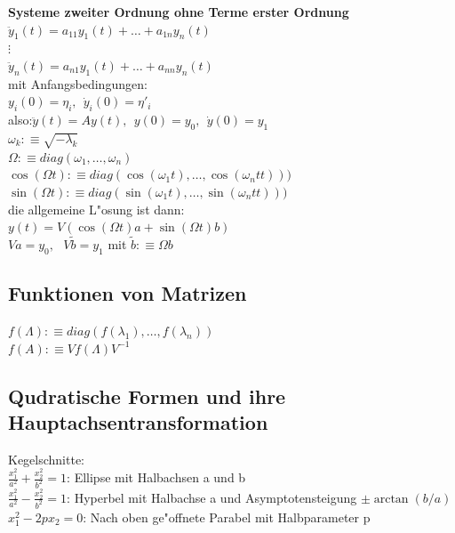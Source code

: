 \documentclass[10pt, a4paper, twocolumn]{scrartcl}
\begin{document}
{\bf Systeme zweiter Ordnung ohne Terme erster Ordnung}\\
$\ddot{y}_1(t)= a_{11}y_1(t) + \ldots + a_{1n}y_n(t)$\\
$\vdots$\\
$\ddot{y}_n(t)= a_{n1}y_1(t) + \ldots + a_{nn}y_n(t)$\\
mit Anfangsbedingungen:\\
$y_i(0)=\eta_i,\:\:\dot{y}_i(0)=\eta'_i$\\
also:$\ddot{y}(t)=Ay(t),\:\:y(0)=y_0,\:\:\dot{y}(0)=y_1$\\
$\omega_k:\equiv \sqrt{-\lambda_k}$\\
$\Omega:\equiv diag(\omega_1,\ldots,\omega_n)$\\
$\cos(\Omega t):\equiv diag(\cos(\omega_1 t),\ldots,\cos(\omega_n t t)))$\\
$\sin(\Omega t):\equiv diag(\sin(\omega_1 t),\ldots,\sin(\omega_n t t)))$\\
die allgemeine L"osung ist dann:\\
$y(t)=V(\cos(\Omega t)a + \sin(\Omega t)b)$\\
$Va=y_0,\:\:\:V\widetilde{b}=y_1$ mit $\widetilde{b}:\equiv\Omega b$


\subsection{Funktionen von Matrizen}

$f(\Lambda) :\equiv diag (f(\lambda_1),\ldots,f(\lambda_n))$\\
$f(A):\equiv Vf(\Lambda)V^{-1}$


\subsection{Qudratische Formen und ihre Hauptachsentransformation}

Kegelschnitte:\\
$\frac{x_1^2}{a^2}+\frac{x_2^2}{b^2}=1$:  Ellipse mit Halbachsen a und b\\
$\frac{x_1^2}{a^2}-\frac{x_2^2}{b^2}=1$:  Hyperbel mit Halbachse a und Asymptotensteigung $\pm\arctan(b/a)$\\
$x_1^2-2px_2=0$:  Nach oben ge"offnete Parabel mit Halbparameter p\\\\
\end{document}
